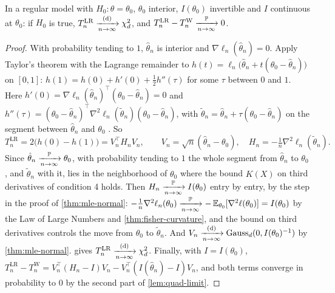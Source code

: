 
\begin{theorem}
\label{thm:wilks}
In a regular model with $H_0: \theta = \theta_0$, $\theta_0$ interior, $I(\theta_0)$ invertible and $I$ continuous at $\theta_0$: if $H_0$ is true, $T^{\mathrm{LR}}_n \xrightarrow [n \to \infty ]{\text{(d)}} \chi^2_d$, and $T^{\mathrm{LR}}_n - T^{\mathrm{W}}_n \xrightarrow [n \to \infty ]{\mathbb{P}} 0$.
\end{theorem}

\begin{proof}
With probability tending to $1$, $\hat{\theta}_n$ is interior and $\nabla\ell_n(\hat{\theta}_n) = 0$.
Apply Taylor's theorem with the Lagrange remainder  to $h(t) = \ell_n\big(\hat{\theta}_n + t(\theta_0 - \hat{\theta}_n)\big)$ on $[0, 1]$: $h(1) = h(0) + h'(0) + \frac12 h''(\tau)$ for some $\tau$ between $0$ and $1$.
Here $h'(0) = \nabla\ell_n(\hat{\theta}_n)^\top(\theta_0 - \hat{\theta}_n) = 0$ and $h''(\tau) = (\theta_0 - \hat{\theta}_n)^\top\nabla^2\ell_n(\tilde{\theta}_n)(\theta_0 - \hat{\theta}_n)$, with $\tilde{\theta}_n = \hat{\theta}_n + \tau(\theta_0 - \hat{\theta}_n)$ on the segment between $\hat{\theta}_n$ and $\theta_0$ .
So
\[
T^{\mathrm{LR}}_n = 2\big(h(0) - h(1)\big) = V_n^\top H_n V_n, \qquad V_n = \sqrt{n}(\hat{\theta}_n - \theta_0), \quad H_n = -\tfrac1n\nabla^2\ell_n(\tilde{\theta}_n).
\]
Since $\hat{\theta}_n \xrightarrow [n \to \infty ]{\mathbb{P}} \theta_0$, with probability tending to $1$ the whole segment from $\hat{\theta}_n$ to $\theta_0$, and $\tilde{\theta}_n$ with it, lies in the neighborhood of $\theta_0$ where the bound $K(X)$ on third derivatives of condition 4 holds.
Then $H_n \xrightarrow [n \to \infty ]{\mathbb{P}} I(\theta_0)$ entry by entry, by the step in the proof of \cref{thm:mle-normal}: $-\frac1n\nabla^2\ell_n(\theta_0) \xrightarrow [n \to \infty ]{\mathbb{P}} -\operatorname*{\mathbb{E}}_{\theta_0}[\nabla^2\ell(\theta_0)] = I(\theta_0)$ by the Law of Large Numbers and \cref{thm:fisher-curvature}, and the bound on third derivatives controls the move from $\theta_0$ to $\tilde{\theta}_n$.
And $V_n \xrightarrow [n \to \infty ]{\text{(d)}} \text{Gauss}_d(0, I(\theta_0)^{-1})$ by \cref{thm:mle-normal}.
 gives $T^{\mathrm{LR}}_n \xrightarrow [n \to \infty ]{\text{(d)}} \chi^2_d$.
Finally, with $I = I(\theta_0)$, $T^{\mathrm{LR}}_n - T^{\mathrm{W}}_n = V_n^\top(H_n - I)V_n - V_n^\top(I(\hat{\theta}_n) - I)V_n$, and both terms converge in probability to $0$ by the second part of \cref{lem:quad-limit}.
\end{proof}

